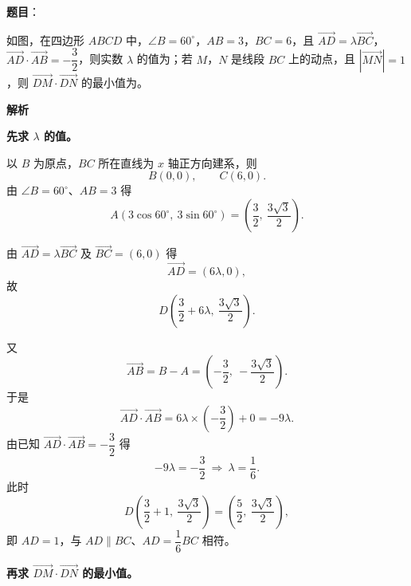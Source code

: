 \begin{answer}

\textbf{题目}：

如图，在四边形 $ABCD$ 中，$\angle B=60^\circ$，$AB=3$，$BC=6$，且 $\overrightarrow{AD}=\lambda\overrightarrow{BC}$，$\overrightarrow{AD}\cdot\overrightarrow{AB}=-\dfrac32$，则实数 $\lambda$ 的值为\gkblank{}；若 $M$，$N$ 是线段 $BC$ 上的动点，且 $\left|\overrightarrow{MN}\right|=1$，则 $\overrightarrow{DM}\cdot\overrightarrow{DN}$ 的最小值为\gkblank{}。
\nopagebreak[4]
\begin{center}\end{center}
\nopagebreak[4]
\textbf{解析}

\textbf{先求 $\lambda$ 的值。}

以 $B$ 为原点，$BC$ 所在直线为 $x$ 轴正方向建系，则
\nopagebreak[4]
\[B(0,0),\qquad C(6,0).\]
由 $\angle B=60^\circ$、$AB=3$ 得
\nopagebreak[4]
\[A\left(3\cos60^\circ,\ 3\sin60^\circ\right)=\left(\frac32,\ \frac{3\sqrt3}2\right).\]

由 $\overrightarrow{AD}=\lambda\overrightarrow{BC}$ 及 $\overrightarrow{BC}=(6,0)$ 得
\nopagebreak[4]
\[\overrightarrow{AD}=(6\lambda,0),\]
故
\nopagebreak[4]
\[D\left(\frac32+6\lambda,\ \frac{3\sqrt3}2\right).\]

又
\nopagebreak[4]
\[\overrightarrow{AB}=B-A=\left(-\frac32,\ -\frac{3\sqrt3}2\right).\]
于是
\nopagebreak[4]
\[\overrightarrow{AD}\cdot\overrightarrow{AB}=6\lambda\times\left(-\frac32\right)+0=-9\lambda .\]
由已知 $\overrightarrow{AD}\cdot\overrightarrow{AB}=-\dfrac32$ 得
\nopagebreak[4]
\[-9\lambda=-\frac32\ \Longrightarrow\ \lambda=\frac16 .\]
此时
\nopagebreak[4]
\[D\left(\frac32+1,\ \frac{3\sqrt3}2\right)=\left(\frac52,\ \frac{3\sqrt3}2\right),\]
即 $AD=1$，与 $AD\parallel BC$、$AD=\dfrac16BC$ 相符。

\textbf{再求 $\overrightarrow{DM}\cdot\overrightarrow{DN}$ 的最小值。}


\end{answer}
